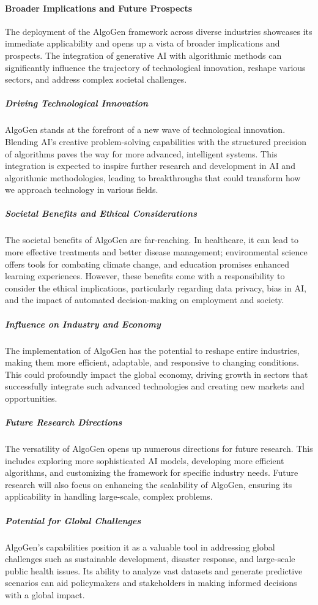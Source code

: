 \documentclass{article}
\begin{document}
\paragraph{Broader Implications and Future Prospects}
The deployment of the AlgoGen framework across diverse industries showcases its immediate applicability and opens up a vista of broader implications and prospects. The integration of generative AI with algorithmic methods can significantly influence the trajectory of technological innovation, reshape various sectors, and address complex societal challenges.

\subparagraph{Driving Technological Innovation}
AlgoGen stands at the forefront of a new wave of technological innovation. Blending AI's creative problem-solving capabilities with the structured precision of algorithms paves the way for more advanced, intelligent systems. This integration is expected to inspire further research and development in AI and algorithmic methodologies, leading to breakthroughs that could transform how we approach technology in various fields.

\subparagraph{Societal Benefits and Ethical Considerations}
The societal benefits of AlgoGen are far-reaching. In healthcare, it can lead to more effective treatments and better disease management; environmental science offers tools for combating climate change, and education promises enhanced learning experiences. However, these benefits come with a responsibility to consider the ethical implications, particularly regarding data privacy, bias in AI, and the impact of automated decision-making on employment and society.

\subparagraph{Influence on Industry and Economy}
The implementation of AlgoGen has the potential to reshape entire industries, making them more efficient, adaptable, and responsive to changing conditions. This could profoundly impact the global economy, driving growth in sectors that successfully integrate such advanced technologies and creating new markets and opportunities.

\subparagraph{Future Research Directions}
The versatility of AlgoGen opens up numerous directions for future research. This includes exploring more sophisticated AI models, developing more efficient algorithms, and customizing the framework for specific industry needs. Future research will also focus on enhancing the scalability of AlgoGen, ensuring its applicability in handling large-scale, complex problems.

\subparagraph{Potential for Global Challenges}
AlgoGen's capabilities position it as a valuable tool in addressing global challenges such as sustainable development, disaster response, and large-scale public health issues. Its ability to analyze vast datasets and generate predictive scenarios can aid policymakers and stakeholders in making informed decisions with a global impact.
\end{document}
